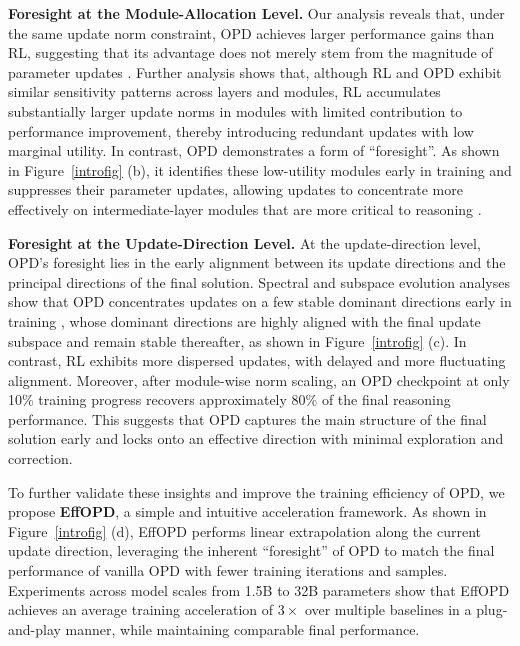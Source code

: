\documentclass{article}
\begin{document}
\textbf{Foresight at the Module-Allocation Level.} 
Our analysis reveals that, under the same update norm constraint, OPD achieves larger performance gains than RL, suggesting that its advantage does not merely stem from the magnitude of parameter updates \citep{geva2021transformerfeedforwardlayerskeyvalue,geva2023dissectingrecallfactualassociations}. Further analysis shows that, although RL and OPD exhibit similar sensitivity patterns across layers and modules, RL accumulates substantially larger update norms in modules with limited contribution to performance improvement, thereby introducing redundant updates with low marginal utility. In contrast, OPD demonstrates a form of ``foresight''. As shown in Figure~\ref{introfig} (b), it identifies these low-utility modules early in training and suppresses their parameter updates, allowing updates to concentrate more effectively on intermediate-layer modules that are more critical to reasoning \citep{meng2023locatingeditingfactualassociations}.


\textbf{Foresight at the Update-Direction Level.}
At the update-direction level, OPD's foresight lies in the early alignment between its update directions and the principal directions of the final solution. Spectral and subspace evolution analyses show that OPD concentrates updates on a few stable dominant directions early in training \citep{zhang2015singularvaluedecompositionapplications}, whose dominant directions are highly aligned with the final update subspace and remain stable thereafter, as shown in Figure~\ref{introfig} (c). In contrast, RL exhibits more dispersed updates, with delayed and more fluctuating alignment. Moreover, after module-wise norm scaling, an OPD checkpoint at only 10\% training progress recovers approximately 80\% of the final reasoning performance. This suggests that OPD captures the main structure of the final solution early and locks onto an effective direction with minimal exploration and correction.

To further validate these insights and improve the training efficiency of OPD, we propose \textbf{EffOPD}, a simple and intuitive acceleration framework. As shown in Figure~\ref{introfig} (d), EffOPD performs linear extrapolation along the current update direction, leveraging the inherent ``foresight'' of OPD to match the final performance of vanilla OPD with fewer training iterations and samples. Experiments across model scales from 1.5B to 32B parameters show that EffOPD achieves an average training acceleration of $3\times$ over multiple baselines in a plug-and-play manner, while maintaining comparable final performance.
\end{document}
